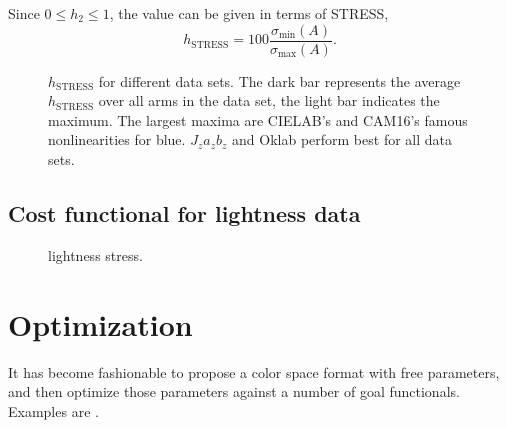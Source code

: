 \documentclass{scrartcl}
\newtheorem*{remark}{Remark}
\theoremstyle{named}
\begin{document}
Since $0\le h_2\le 1$, the value can be given in terms of STRESS,
\begin{equation}\label{eq:hstress}
  h_\text{STRESS} = 100 \frac{\sigma_{\min}(A)}{\sigma_{\max}(A)}.
\end{equation}




\begin{figure}
  \centering
  
  \caption{$h_\text{STRESS}$ for different data sets. The dark bar represents the
  average $h_\text{STRESS}$ over all arms in the data set, the light bar indicates the
  maximum.  The largest maxima are CIELAB's and CAM16's famous nonlinearities for blue.
  $J_za_zb_z$ and Oklab perform best for all data sets.}
  \label{fig:hstress}
\end{figure}

\subsection{Cost functional for lightness data}

\cite{fairchildchen}

\begin{figure}
  \centering
  
  \caption{lightness stress.}
\end{figure}


\section{Optimization}

It has become fashionable to propose a color space format with free parameters, and then
optimize those parameters against a number of goal functionals. Examples are
\cite{prolab,oklab,jzazbz}.


{}

\end{document}
